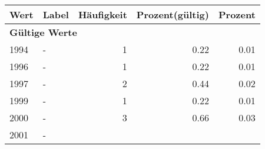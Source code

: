      \begin{longtable}{lXrrr}
     \toprule
     \textbf{Wert} & \textbf{Label} & \textbf{Häufigkeit} & \textbf{Prozent(gültig)} & \textbf{Prozent} \\
     \endhead
     \midrule
     \multicolumn{5}{l}{\textbf{Gültige Werte}}\\

     1994 &
     \multicolumn{1}{X}{ -  } &


       \num{1} &
       \num[round-mode=places,round-precision=2]{0,22} &
         \num[round-mode=places,round-precision=2]{0,01} \\

     1996 &
     \multicolumn{1}{X}{ -  } &


       \num{1} &
       \num[round-mode=places,round-precision=2]{0,22} &
         \num[round-mode=places,round-precision=2]{0,01} \\

     1997 &
     \multicolumn{1}{X}{ -  } &


       \num{2} &
       \num[round-mode=places,round-precision=2]{0,44} &
         \num[round-mode=places,round-precision=2]{0,02} \\

     1999 &
     \multicolumn{1}{X}{ -  } &


       \num{1} &
       \num[round-mode=places,round-precision=2]{0,22} &
         \num[round-mode=places,round-precision=2]{0,01} \\

     2000 &
     \multicolumn{1}{X}{ -  } &


       \num{3} &
       \num[round-mode=places,round-precision=2]{0,66} &
         \num[round-mode=places,round-precision=2]{0,03} \\

     2001 &
     \multicolumn{1}{X}{ -  } &



\end{longtable}
